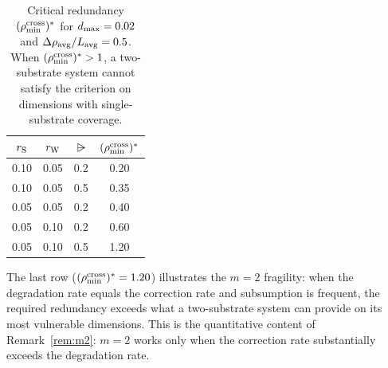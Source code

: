 \begin{table}[h]
\centering
\small
\begin{tabular}{@{}cccc@{}}
\toprule
$r_{\mathrm{S}}$ & $r_{\mathrm{W}}$ & $\rsub$ & $(\rho_{\min}^{\mathrm{cross}})^*$ \\
\midrule
0.10 & 0.05 & 0.2 & 0.20 \\
0.10 & 0.05 & 0.5 & 0.35 \\
0.05 & 0.05 & 0.2 & 0.40 \\
0.05 & 0.10 & 0.2 & 0.60 \\
0.05 & 0.10 & 0.5 & 1.20 \\
\bottomrule
\end{tabular}
\caption{Critical redundancy $(\rho_{\min}^{\mathrm{cross}})^*$ for $d_{\mathrm{max}} = 0.02$
  and $\Delta\rho_{\mathrm{avg}} / L_{\mathrm{avg}} = 0.5$.
  When $(\rho_{\min}^{\mathrm{cross}})^* > 1$, a two-substrate system cannot satisfy the
  criterion on dimensions with single-substrate coverage.}
\label{tab:sensitivity}
\end{table}

The last row ($(\rho_{\min}^{\mathrm{cross}})^* = 1.20$) illustrates the $m = 2$
fragility: when the degradation rate equals the correction rate and
subsumption is frequent, the required redundancy exceeds what a
two-substrate system can provide on its most vulnerable dimensions.
This is the quantitative content of Remark~\ref{rem:m2}: $m = 2$ works
only when the correction rate substantially exceeds the degradation
rate.
